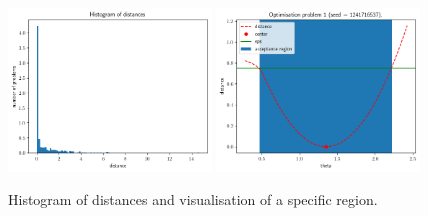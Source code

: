\begin{figure}[h]
    \begin{center}
      \includegraphics[width=0.48\textwidth]{./Thesis/images/chapter3/example_theta_dist.png}
      \includegraphics[width=0.48\textwidth]{./Thesis/images/chapter3/example_region.png}
    \end{center}
  \caption[Histogram of distances at the 1D example.]{Histogram of distances and visualisation of a specific region.}
  \label{fig:example_training_hist}
\end{figure}
